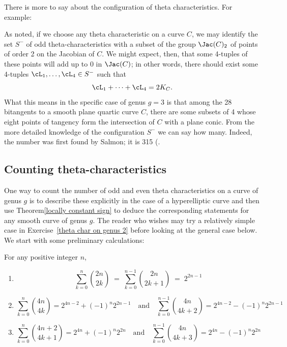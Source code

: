 There is more to say about the configuration of theta characteristics. For example:
\begin{fact}
 As noted, if we choose any theta characteristic on a curve $C$, we may identify the set $S^-$ of odd theta-characteristics with a subset of the group $\Jac(C)_2$ of points of order 2 on the Jacobian of $C$. We might expect, then, that some 4-tuples of these points will add up to 0 in $\Jac(C)$; in other words, there should exist some 4-tuples $\cL_1,\dots,\cL_4 \in S^-$ such that
$$
\cL_1+ \dots +\cL_4 = 2K_C.
$$
What this means in the specific case of genus $g=3$ is that among the 28 bitangents to a smooth plane quartic curve $C$, there are some subsets of 4 whose eight points of tangency form the intersection of $C$ with a plane conic. From the more detailed knowledge of the configuration $S^-$ we can say how many. Indeed, the number was first found by Salmon; it is 315 (\cite{MR0115124}.
\end{fact}

\subsection{Counting theta-characteristics}\label{theta characteristic count}

One way to count the number of odd and even theta characteristics on a curve of genus $g$ is  to describe these explicitly in the case of a hyperelliptic curve and then use Theorem\ref{locally constant sign} to deduce the corresponding statements for any smooth curve of genus $g$. 
The reader who wishes may  try a relatively simple case in Exercise~\ref{theta char on genus 2} before looking at the general case below.
We start with some preliminary calculations:

\begin{lemma}\label{summing binomials}
For any positive integer $n$,
\begin{enumerate}
\item 
$$
\sum_{k=0}^n \binom{2n}{2k} \; = \; \sum_{k=0}^{n-1} \binom{2n}{2k+1} \; = \; 2^{2n-1}
$$
\item 
$$
\sum_{k=0}^n \binom{4n}{4k} = 2^{4n-2}  + (-1)^n 2^{2n-1} \quad \text{and} \quad \sum_{k=0}^{n-1} \binom{4n}{4k+2} = 2^{4n-2} - (-1)^n  2^{2n-1}
$$
\item 
$$
\sum_{k=0}^n \binom{4n+2}{4k+1} = 2^{4n} + (-1)^n 2^{2n} \quad \text{and} \quad \sum_{k=0}^{n-1} \binom{4n}{4k+3} = 2^{4n} - (-1)^n  2^{2n}
$$
\end{enumerate}
\end{lemma}

